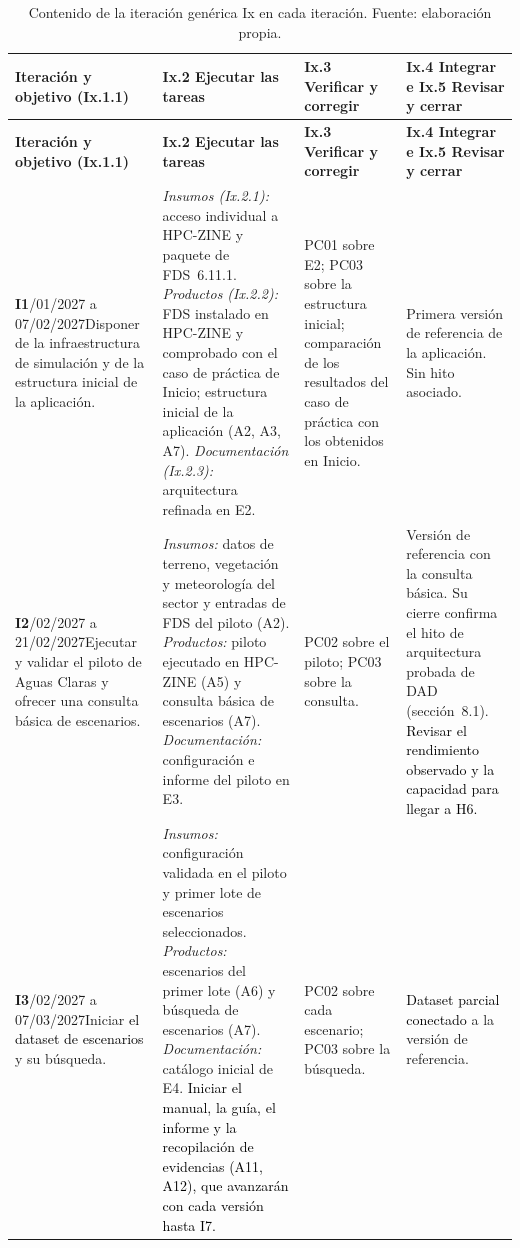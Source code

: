 \begin{longtable}{|p{}|p{}|p{}|p{}|}
\caption{Contenido de la iteración genérica Ix en cada iteración. Fuente: elaboración propia.}\label{tab:wbs-variaciones}\\
\hline
\raggedright \textbf{Iteración y objetivo (Ix.1.1)} & \textbf{Ix.2 Ejecutar las tareas} & \raggedright \textbf{Ix.3 Verificar y corregir} & \raggedright \textbf{Ix.4 Integrar e Ix.5 Revisar y cerrar}\tabularnewline\hline
\endfirsthead
\hline
\raggedright \textbf{Iteración y objetivo (Ix.1.1)} & \textbf{Ix.2 Ejecutar las tareas} & \raggedright \textbf{Ix.3 Verificar y corregir} & \raggedright \textbf{Ix.4 Integrar e Ix.5 Revisar y cerrar}\tabularnewline\hline
\endhead
\raggedright \textbf{I1}\newline 25/01/2027 a 07/02/2027\newline Disponer de la infraestructura de simulación y de la estructura inicial de la aplicación. & \textit{Insumos (Ix.2.1):} acceso individual a HPC-ZINE y paquete de FDS~6.11.1. \textit{Productos (Ix.2.2):} FDS instalado en HPC-ZINE y comprobado con el caso de práctica de Inicio; estructura inicial de la aplicación (A2, A3, A7). \textit{Documentación (Ix.2.3):} arquitectura refinada en E2. & \raggedright PC01 sobre E2; PC03 sobre la estructura inicial; comparación de los resultados del caso de práctica con los obtenidos en Inicio. & \raggedright Primera versión de referencia de la aplicación. Sin hito asociado.\tabularnewline\hline
\raggedright \textbf{I2}\newline 08/02/2027 a 21/02/2027\newline Ejecutar y validar el piloto de Aguas Claras y ofrecer una consulta básica de escenarios. & \textit{Insumos:} datos de terreno, vegetación y meteorología del sector y entradas de FDS del piloto (A2). \textit{Productos:} piloto ejecutado en HPC-ZINE (A5) y consulta básica de escenarios (A7). \textit{Documentación:} configuración e informe del piloto en E3. & \raggedright PC02 sobre el piloto; PC03 sobre la consulta. & \raggedright Versión de referencia con la consulta básica. Su cierre confirma el hito de arquitectura probada de DAD (sección~8.1). \textcolor{black}{Revisar el rendimiento observado y la capacidad para llegar a H6.}\tabularnewline\hline
\raggedright \textbf{I3}\newline 22/02/2027 a 07/03/2027\newline Iniciar \textcolor{black}{el dataset de escenarios} y su búsqueda. & \textit{Insumos:} configuración validada en el piloto y primer lote de escenarios seleccionados. \textit{Productos:} escenarios del primer lote (A6) y búsqueda de escenarios (A7). \textit{Documentación:} catálogo inicial de E4. \textcolor{black}{Iniciar el manual, la guía, el informe y la recopilación de evidencias (A11, A12), que avanzarán con cada versión hasta I7.} & \raggedright PC02 sobre cada escenario; PC03 sobre la búsqueda. & \raggedright \textcolor{black}{Dataset parcial conectado} a la versión de referencia.\tabularnewline\hline

\end{longtable}
